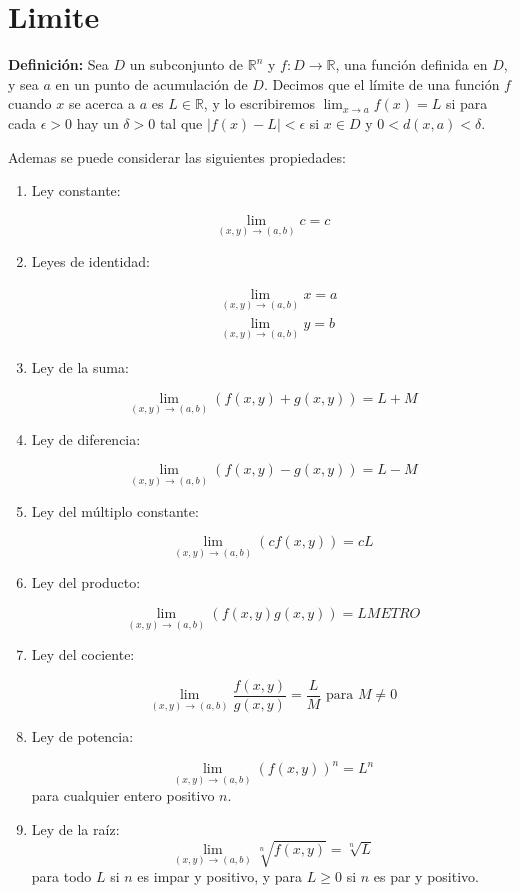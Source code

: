 \section{Limite}
\textbf{Definición:} Sea $D$ un subconjunto de $\mathbb{R}^{n}$ y $f: D \rightarrow \mathbb{R}$, una función definida en $D$, y sea $a$ en un punto de acumulación de $D$. Decimos que el límite de una función $f$ cuando $x$ se acerca a $a$ es $L \in \mathbb{R}$, y lo escribiremos $\lim _{x \rightarrow a} f(x)=L$ si para cada $\epsilon>0$ hay un $\delta>0$ tal que $|f(x)-L|<\epsilon$ si $x \in D$ y $0<d(x, a)<\delta$.\par
Ademas se puede considerar las siguientes propiedades:\par
\begin{enumerate}
    \item Ley constante:\par
          $$
              \lim _{(x, y) \rightarrow(a, b)} c=c
          $$
    \item Leyes de identidad:\par
          $$
              \begin{aligned}
                   & \lim _{(x, y) \rightarrow(a, b)} x=a \\
                   & \lim _{(x, y) \rightarrow(a, b)} y=b
              \end{aligned}
          $$
    \item Ley de la suma:\par
          $$
              \lim _{(x, y) \rightarrow(a, b)}(f(x, y)+g(x, y))=L+M
          $$
    \item Ley de diferencia:\par
          $$
              \lim _{(x, y) \rightarrow(a, b)}(f(x, y)-g(x, y))=L-M
          $$
    \item Ley del múltiplo constante:\par
          $$
              \lim _{(x, y) \rightarrow(a, b)}(c f(x, y))=c L
          $$
    \item Ley del producto:\par
          $$
              \lim _{(x, y) \rightarrow(a, b)}(f(x, y) g(x, y))=L METRO
          $$
    \item Ley del cociente:\par
          $$
              \lim _{(x, y) \rightarrow(a, b)} \frac{f(x, y)}{g(x, y)}=\frac{L}{M} \text { para } M \neq 0
          $$
    \item Ley de potencia:\par
          $$
              \lim _{(x, y) \rightarrow(a, b)}(f(x, y))^{n}=L^{n}
          $$
          para cualquier entero positivo $n$.\par
    \item Ley de la raíz:
          $$
              \lim _{(x, y) \rightarrow(a, b)} \sqrt[n]{f(x, y)}=\sqrt[n]{L}
          $$
          para todo $L$ si $n$ es impar y positivo, y para $L \geq 0$ si $n$ es par y positivo.\par
\end{enumerate}
